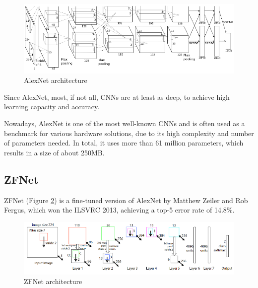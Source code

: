 \begin{figure} [H]
	\centering
	\includegraphics[width=\textwidth]{Images/CNNArchitectures/AlexNet.png}
	\decoRule
	\caption[AlexNet architecture]{AlexNet architecture}
	\label{fig:AlexNet}
\end{figure}

Since AlexNet, most, if not all, CNNs are at least as deep, to achieve high learning capacity and accuracy.

Nowadays, AlexNet is one of the most well-known CNNs and is often used as a benchmark for various hardware solutions, due to its high complexity and number of parameters needed. In total, it uses more than 61 million parameters, which results in a size of about 250MB.

\subsection{ZFNet}
ZFNet \cite{Visualizing-and-Understanding-Convolutional-Networks} (Figure \ref{fig:ZFNet}) is a fine-tuned version of AlexNet by Matthew Zeiler and Rob Fergus, which won the ILSVRC 2013, achieving a top-5 error rate of 14.8\%.

\begin{figure} [H]
	\centering
	\includegraphics[width=\textwidth]{Images/CNNArchitectures/ZFNet.png}
	\decoRule
	\caption[ZFNet architecture]{ZFNet architecture}
	\label{fig:ZFNet}
\end{figure}

